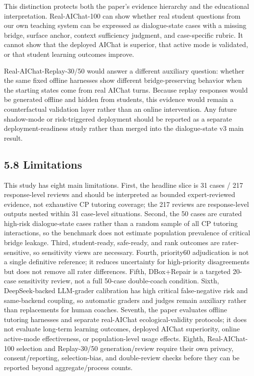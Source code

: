 \documentclass[11pt]{article}
\begin{document}
This distinction protects both the paper's evidence hierarchy and the educational interpretation. Real-AIChat-100 can show whether real student questions from our own teaching system can be expressed as dialogue-state cases with a missing bridge, surface anchor, context sufficiency judgment, and case-specific rubric. It cannot show that the deployed AIChat is superior, that active mode is validated, or that student learning outcomes improve.

Real-AIChat-Replay-30/50 would answer a different auxiliary question: whether the same fixed offline harnesses show different bridge-preserving behavior when the starting states come from real AIChat turns. Because replay responses would be generated offline and hidden from students, this evidence would remain a counterfactual validation layer rather than an online intervention. Any future shadow-mode or risk-triggered deployment should be reported as a separate deployment-readiness study rather than merged into the dialogue-state v3 main result.

\subsection{5.8 Limitations}

This study has eight main limitations. First, the headline slice is 31 cases / 217 response-level reviews and should be interpreted as bounded expert-reviewed evidence, not exhaustive CP tutoring coverage; the 217 reviews are response-level outputs nested within 31 case-level situations. Second, the 50 cases are curated high-risk dialogue-state cases rather than a random sample of all CP tutoring interactions, so the benchmark does not estimate population prevalence of critical bridge leakage. Third, student-ready, safe-ready, and rank outcomes are rater-sensitive, so sensitivity views are necessary. Fourth, priority60 adjudication is not a single definitive reference; it reduces uncertainty for high-priority disagreements but does not remove all rater differences. Fifth, DBox+Repair is a targeted 20-case sensitivity review, not a full 50-case double-coach condition. Sixth, DeepSeek-backed LLM-grader calibration has high critical false-negative risk and same-backend coupling, so automatic graders and judges remain auxiliary rather than replacements for human coaches. Seventh, the paper evaluates offline tutoring harnesses and separate real-AIChat ecological-validity protocols; it does not evaluate long-term learning outcomes, deployed AIChat superiority, online active-mode effectiveness, or population-level usage effects. Eighth, Real-AIChat-100 selection and Replay-30/50 generation/review require their own privacy, consent/reporting, selection-bias, and double-review checks before they can be reported beyond aggregate/process counts.
\end{document}
